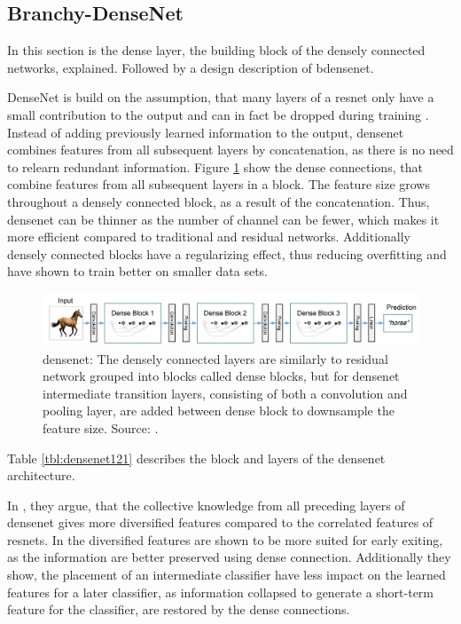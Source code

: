 \newpage\subsection{Branchy-DenseNet}

In this section is the dense layer, the building block of the densely connected networks, explained. Followed by a design description of \gls{bdensenet}.

DenseNet \cite{huang_densely_2016} is build on the assumption, that many layers of a \gls{resnet} only have a small contribution to the output and can in fact be dropped during training \cite{huang_densely_2016}. Instead of adding previously learned information to the output, \gls{densenet} combines features from all subsequent layers by concatenation, as there is no need to relearn redundant information. Figure \ref{fig:densenet} show the dense connections, that combine features from all subsequent layers in a block. The feature size grows throughout a densely connected block, as a result of the concatenation. Thus, \gls{densenet} can be thinner as the number of channel can be fewer, which makes it more efficient compared to traditional and residual networks. Additionally densely connected blocks have a regularizing effect, thus reducing overfitting and have shown to train better on smaller data sets.

\begin{figure}
	\centering
	\includegraphics[width=\linewidth]{figures/models/densenet}
	\caption[\gls{densenet}]{\gls{densenet}: The densely connected layers are similarly to residual network grouped into blocks called dense blocks, but for \gls{densenet} intermediate transition layers, consisting of both a convolution and pooling layer, are added between dense block to downsample the feature size. Source:  \cite{huang_densely_2016}.}
	\label{fig:densenet}
\end{figure}

Table \ref{tbl:densenet121} describes the block and layers of the \gls{densenet} architecture. 

In \cite{huang_multi-scale_2017}, they argue, that the collective knowledge from all preceding layers of \gls{densenet} gives more diversified features compared to the correlated features of \gls{resnet}s. In \cite{huang_multi-scale_2017} the diversified features are shown to be more suited for early exiting, as the information are better preserved using dense connection. Additionally they show, the placement of an intermediate classifier have less impact on the learned features for a later classifier, as information collapsed to generate a short-term feature for the classifier, are restored by the dense connections.


